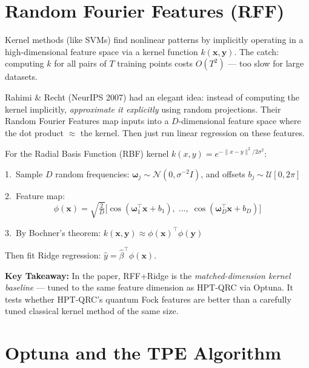 \documentclass[11pt]{article}
\newcommand{\concept}[2]{%
  \begin{tcolorbox}[conceptbox, title={#1}]
  #2
  \end{tcolorbox}
}
\newcommand{\mathblock}[2]{%
  \begin{tcolorbox}[mathbox, title={Math: #1}]
  #2
  \end{tcolorbox}
}
\newcommand{\keypoint}[1]{%
  \begin{tcolorbox}[keybox]
  \textbf{Key Takeaway:} #1
  \end{tcolorbox}
}
\begin{document}
\section{Random Fourier Features (RFF)}

\concept{Kernel Methods Without the $O(T^2)$ Cost}{
Kernel methods (like SVMs) find nonlinear patterns by implicitly operating
in a high-dimensional feature space via a kernel function
$k(\mathbf{x}, \mathbf{y})$. The catch: computing $k$ for all pairs of
$T$ training points costs $O(T^2)$ --- too slow for large datasets.

Rahimi \& Recht (NeurIPS 2007) had an elegant idea: instead of computing
the kernel implicitly, \emph{approximate it explicitly} using random
projections. Their Random Fourier Features map inputs into a
$D$-dimensional feature space where the dot product $\approx$ the kernel.
Then just run linear regression on these features.
}

\mathblock{RFF Construction (RBF Kernel)}{
For the Radial Basis Function (RBF) kernel $k(x,y) = e^{-\|x-y\|^2 / 2\sigma^2}$:

1.\ Sample $D$ random frequencies: $\boldsymbol\omega_j \sim \mathcal{N}(0,
   \sigma^{-2} I)$, and offsets $b_j \sim \mathcal{U}[0, 2\pi]$

2.\ Feature map:
\[
  \phi(\mathbf{x}) = \sqrt{\tfrac{2}{D}}
  \bigl[\cos(\boldsymbol\omega_1^\top \mathbf{x} + b_1),\;
        \ldots,\;
        \cos(\boldsymbol\omega_D^\top \mathbf{x} + b_D)\bigr]
\]

3.\ By Bochner's theorem: $k(\mathbf{x}, \mathbf{y})
    \approx \phi(\mathbf{x})^\top \phi(\mathbf{y})$

Then fit Ridge regression: $\hat y = \hat\beta^\top \phi(\mathbf{x})$.
}

\keypoint{In the paper, RFF+Ridge is the \emph{matched-dimension kernel
baseline} --- tuned to the same feature dimension as HPT-QRC via Optuna.
It tests whether HPT-QRC's quantum Fock features are better than a
carefully tuned classical kernel method of the same size.}

\section{Optuna and the TPE Algorithm}
\end{document}
